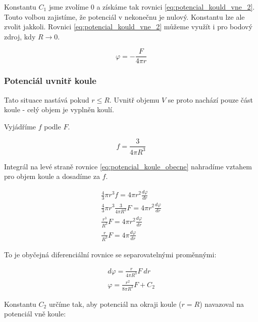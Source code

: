 \documentclass{book}
\begin{document}
Konstantu \(C_1\) jsme zvolíme 0 a získáme tak rovnici \eqref{eq:potencial_kould_vne_2}. Touto volbou zajistíme, že potenciál v nekonečnu je nulový. Konstantu lze ale zvolit jakkoli. Rovnici \eqref{eq:potencial_kould_vne_2} můžeme využít i pro bodový zdroj, kdy \(R \rightarrow 0\).

\begin{equation}
\label{eq:potencial_koule_vne_2}
\varphi = -\frac{F}{4 \pi r}
\end{equation}

\subsubsection{Potenciál uvnitř koule}

Tato situace nastává pokud \(r \leq R\). Uvnitř objemu \(V\) se proto nachází pouze část koule - celý objem je vyplněn koulí.

Vyjádříme \(f\) podle \(F\).

\begin{equation}
f = \frac{3}{4 \pi R^3}
\end{equation}

Integrál na levé straně rovnice \eqref{eq:potencial_koule_obecne} nahradíme vztahem pro objem koule a dosadíme za \(f\).

\begin{equation}
\begin{split}
\frac{4}{3} \pi r^3 f = 4 \pi r^2 \frac{d \varphi}{dr} \\
\frac{4}{3} \pi r^3 \frac{3}{4 \pi R^3} F = 4 \pi r^2 \frac{d \varphi}{dr} \\
\frac{r^3}{R^3} F = 4 \pi r^2 \frac{d \varphi}{dr} \\
\frac{r}{R^3} F = 4 \pi \frac{d \varphi}{dr}
\end{split}
\end{equation}

To je obyčejná diferenciální rovnice se separovatelnými proměnnými:

\begin{equation}
\label{eq:potencial_disku_uvnitr}
\begin{split}
d \varphi = \frac{r}{4 \pi R^3} F \ dr \\
\varphi = \frac{r^2}{8 \pi R^3} F + C_2
\end{split}
\end{equation}

Konstantu \(C_2\) určíme tak, aby potenciál na okraji koule (\(r = R\)) navazoval na potenciál vně koule:
\end{document}
